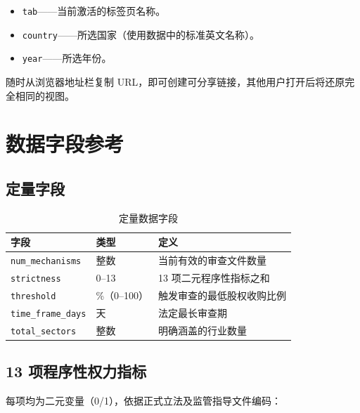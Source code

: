 \documentclass[12pt,a4paper]{article}
\newcommand{\fieldname}[1]{\texttt{\small#1}}
\begin{document}
\begin{itemize}
  \item \texttt{tab}——当前激活的标签页名称。
  \item \texttt{country}——所选国家（使用数据中的标准英文名称）。
  \item \texttt{year}——所选年份。
\end{itemize}

随时从浏览器地址栏复制 URL，即可创建可分享链接，其他用户打开后将还原完全相同的视图。

\section{数据字段参考}
\label{sec:fields}

\subsection{定量字段}

\begin{table}[h]
\centering
\begin{tabularx}{\linewidth}{llX}
\toprule
\textbf{字段} & \textbf{类型} & \textbf{定义} \\
\midrule
\fieldname{num\_mechanisms} & 整数 & 当前有效的审查文件数量 \\
\fieldname{strictness} & 0--13 & 13 项二元程序性指标之和 \\
\fieldname{threshold} & \%（0--100） & 触发审查的最低股权收购比例 \\
\fieldname{time\_frame\_days} & 天 & 法定最长审查期 \\
\fieldname{total\_sectors} & 整数 & 明确涵盖的行业数量 \\
\bottomrule
\end{tabularx}
\caption{定量数据字段}
\end{table}

\subsection{13 项程序性权力指标}

每项均为二元变量（0/1），依据正式立法及监管指导文件编码：
\end{document}
